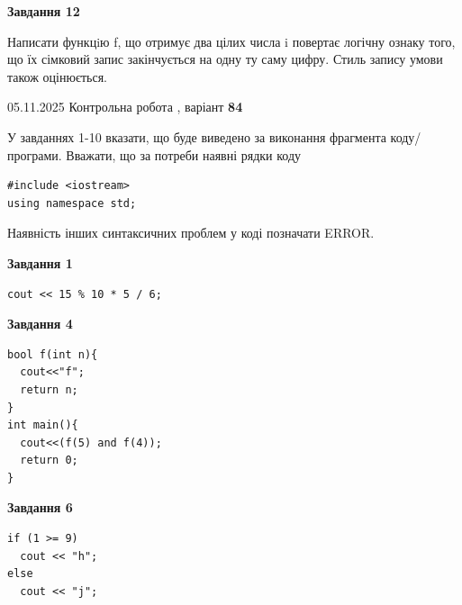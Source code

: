 \documentclass[12pt, ukrainian]{article}
\begin{document}
{\begin {large}
\begin{minipage}[t]{11.0cm}
\begin{center}
\textbf{Завдання 12}
\end{center}

Написати функцiю f, що отримує два цілих числа i повертає логічну ознаку того, що їх сімковий запис закінчується на одну ту саму цифру. Стиль запису умови також оцінюється.\par

\end{minipage}

\end {large}}
\newpage

{\Large{05.11.2025 Контрольна робота , варіант  \No \textbf { 84 }\par}}
{
\begin {large}
У завданнях 1-10 вказати, що буде виведено за виконання фрагмента коду/про\-гра\-ми.
Вважати, що за потреби наявні рядки коду
\begin{verbatim}
#include <iostream>
using namespace std;
\end{verbatim}
Наявність інших синтаксичних проблем у коді позначати ERROR.

\begin{minipage}[t]{7.0cm}

\begin{center}
\textbf{Завдання 1}
\end{center}
\vspace{-8mm}

\begin{verbatim}
cout << 15 % 10 * 5 / 6;
\end{verbatim}



\begin{center}
\textbf{Завдання 4}
\end{center}
\vspace{-8mm}

\begin{verbatim}
bool f(int n){
  cout<<"f";
  return n;
}
int main(){
  cout<<(f(5) and f(4));
  return 0;
}
\end{verbatim}



\begin{center}
\textbf{Завдання 6}
\end{center}
\vspace{-8mm}

\begin{verbatim}
if (1 >= 9)
  cout << "h";
else
  cout << "j";
\end{verbatim}




\end{minipage}
\end{large}}
\end{document}

